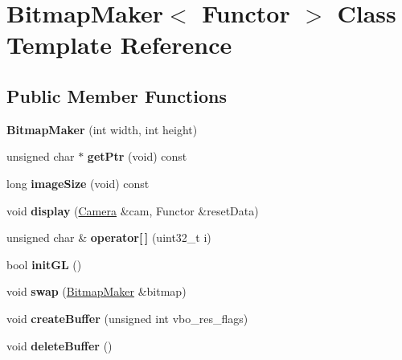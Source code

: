 \hypertarget{class_bitmap_maker}{}\section{Bitmap\+Maker$<$ Functor $>$ Class Template Reference}
\label{class_bitmap_maker}
\subsection*{Public Member Functions}
\begin{DoxyCompactItemize}
\item 
{\bfseries Bitmap\+Maker} (int width, int height)
\item 
unsigned char $\ast$ {\bfseries get\+Ptr} (void) const
\item 
long {\bfseries image\+Size} (void) const
\item 
void {\bfseries display} (\hyperlink{struct_camera}{Camera} \&cam, Functor \&reset\+Data)\hypertarget{class_bitmap_maker_a233746936bb4d610ac0ad87094a07caf}{}\label{class_bitmap_maker_a233746936bb4d610ac0ad87094a07caf}

\item 
unsigned char \& {\bfseries operator\mbox{[}$\,$\mbox{]}} (uint32\+\_\+t i)
\item 
bool {\bfseries init\+GL} ()
\item 
void {\bfseries swap} (\hyperlink{class_bitmap_maker}{Bitmap\+Maker} \&bitmap)
\item 
void {\bfseries create\+Buffer} (unsigned int vbo\+\_\+res\+\_\+flags)
\item 
void {\bfseries delete\+Buffer} ()
\end{DoxyCompactItemize}
